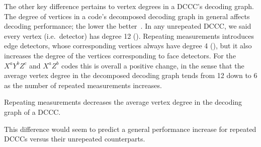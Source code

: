 The other key difference pertains to vertex degrees in a DCCC's decoding graph.
The degree of vertices in a code's decomposed decoding graph in general affects decoding performance; the lower the better~\cite{OscarSubsystemGaugeFixing}.
In any unrepeated DCCC, we said every vertex (i.e.\ detector) has degree 12 ().
Repeating measurements introduces edge detectors, whose corresponding vertices always have degree 4 (),
but it also increases the degree of the vertices corresponding to face detectors.
For the $X^a Y^b Z^c$ and $X^a Z^b$ codes this is overall a positive change,
in the sense that the average vertex degree in the decomposed decoding graph tends from 12 down to 6 as the number of repeated measurements increases.

\begin{difference}\label{dif:repeating_decoding_graph_degrees}
Repeating measurements decreases the average vertex degree in the decoding graph of a DCCC.
\end{difference}

This difference would seem to predict a general performance increase for repeated DCCCs versus their unrepeated counterparts.

